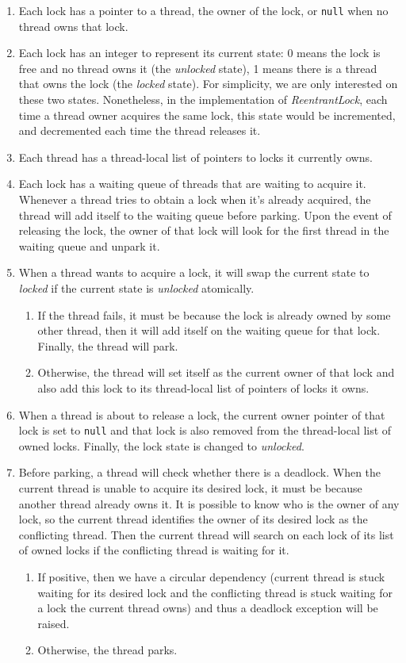 \begin{enumerate}
\item Each lock has a pointer to a thread, the owner of the lock, or {\tt null} when no thread owns that lock.
\item Each lock has an integer to represent its current state: 0 means the lock is free and no thread owns it (the \emph{unlocked} state), 1 means there is a thread that owns the lock (the \emph{locked} state). For simplicity, we are only interested on these two states. Nonetheless, in the implementation of \emph{ReentrantLock}, each time a thread owner acquires the same lock, this state would be incremented, and decremented each time the thread releases it.
\item Each thread has a thread-local list of pointers to locks it currently owns.
\item Each lock has a waiting queue of threads that are waiting to acquire it. Whenever a thread tries to obtain a lock when it's already acquired, the thread will add itself to the waiting queue before parking. Upon the event of releasing the lock, the owner of that lock will look for the first thread in the waiting queue and unpark it.
\item When a thread wants to acquire a lock, it will swap the current state to \emph{locked} if the current state is \emph{unlocked} atomically.
\begin{enumerate}
\item If the thread fails, it must be because the lock is already owned by some other thread, then it will add itself on the waiting queue for that lock. Finally, the thread will park.
\item Otherwise, the thread will set itself as the current owner of that lock and also add this lock to its thread-local list of pointers of locks it owns.
\end{enumerate}
\item When a thread is about to release a lock, the current owner pointer of that lock is set to {\tt null} and that lock is also removed from the thread-local list of owned locks. Finally, the lock state is changed to \emph{unlocked}.
\item Before parking, a thread will check whether there is a deadlock. When the current thread is unable to acquire its desired lock, it must be because another thread already owns it. It is possible to know who is the owner of any lock, so the current thread identifies the owner of its desired lock as the conflicting thread. Then the current thread will search on each lock of its list of owned locks if the conflicting thread is waiting for it.
\begin{enumerate}
\item If positive, then we have a circular dependency (current thread is stuck waiting for its desired lock and the conflicting thread is stuck waiting for a lock the current thread owns) and thus a deadlock exception will be raised.
\item Otherwise, the thread parks.
\end{enumerate}
\end{enumerate}

